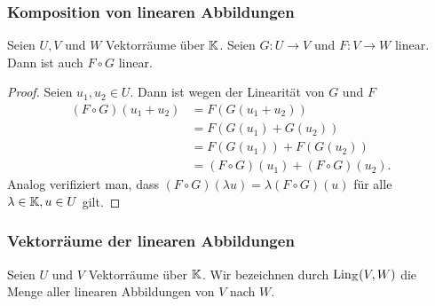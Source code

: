 \subsubsection{Komposition von linearen Abbildungen}

\begin{propn}
	Seien $ U, V $ und $ W $ Vektorräume über $ \mathbb K $. Seien $ G : U \to V $ und $ F : V \to W $ linear. Dann ist auch $ F \circ G $ linear.
\end{propn}
\begin{proof}
	Seien $ u_1, u_2 \in U $. Dann ist wegen der Linearität von $ G $ und $ F $
	\begin{align*}
		(F \circ G)(u_1+u_2) &= F(G(u_1+u_2)) \\
		&= F(G(u_1)+G(u_2)) \\
		&= F(G(u_1))+F(G(u_2)) \\
		&= (F \circ G)(u_1) + (F \circ G)(u_2).
	\end{align*}
	Analog verifiziert man, dass $ (F \circ G)(\lambda u) = \lambda (F \circ G)(u) $ für alle $ \lambda \in \mathbb K, u \in U $ gilt.
\end{proof}

\subsubsection{Vektorräume der linearen Abbildungen}

Seien $ U $ und $ V $ Vektorräume über $ \mathbb K $. Wir bezeichnen durch $ \operatorname{Lin}_\mathbb K(V,W) $ die Menge aller linearen Abbildungen von $ V $ nach $ W $.

